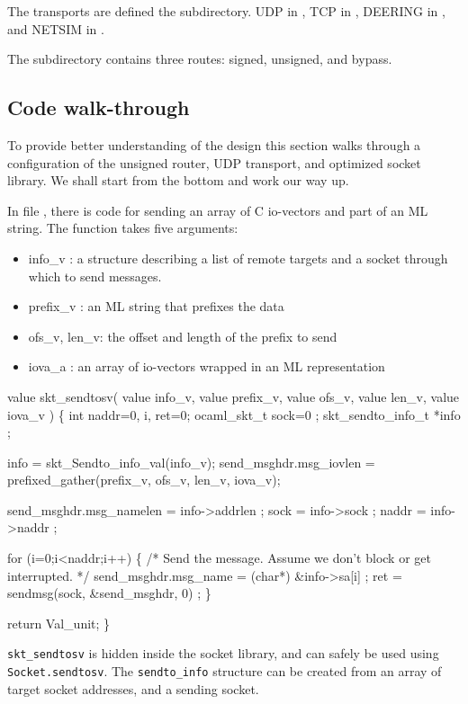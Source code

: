 The transports are defined the  subdirectory. 
UDP in , TCP in ,
DEERING in , and NETSIM in
.

The  subdirectory contains three routes: signed,
unsigned, and bypass.

\subsection{Code walk-through}
To provide better understanding of the design this section walks
through a configuration of the unsigned router, UDP transport, 
and optimized socket library. We shall start from the bottom
and work our way up. 

In file , there is code for sending an
array of C io-vectors and part of an ML string. The function takes
five arguments:
\begin{itemize}
\item info\_v : a structure describing a list of remote targets and a
socket through which to send messages.
\item prefix\_v : an ML string that prefixes the data
\item ofs\_v, len\_v: the offset and length of the prefix to send
\item iova\_a : an array of io-vectors wrapped in an ML representation
\end{itemize}

\begin{codebox}
value skt_sendtosv(
	value info_v,
	value prefix_v,
	value ofs_v,
	value len_v,
	value iova_v
) \{
  int naddr=0, i, ret=0;
  ocaml_skt_t sock=0 ;
  skt_sendto_info_t *info ;

  info = skt_Sendto_info_val(info_v);
  send_msghdr.msg_iovlen = prefixed_gather(prefix_v, ofs_v, len_v, iova_v); 

  send_msghdr.msg_namelen = info->addrlen ;
  sock = info->sock ;
  naddr = info->naddr ;

  for (i=0;i<naddr;i++) \{
    /* Send the message.  Assume we don't block or get interrupted.  
     */
    send_msghdr.msg_name = (char*) &info->sa[i] ;
    ret = sendmsg(sock, &send_msghdr, 0) ;
  \}

  return Val_unit;
\}
\end{codebox}


{\tt skt\_sendtosv} is hidden inside the socket library, and can
safely be used using {\tt Socket.sendtosv}. The {\tt sendto\_info}
structure can be created from an array of target socket addresses, and
a sending socket.

